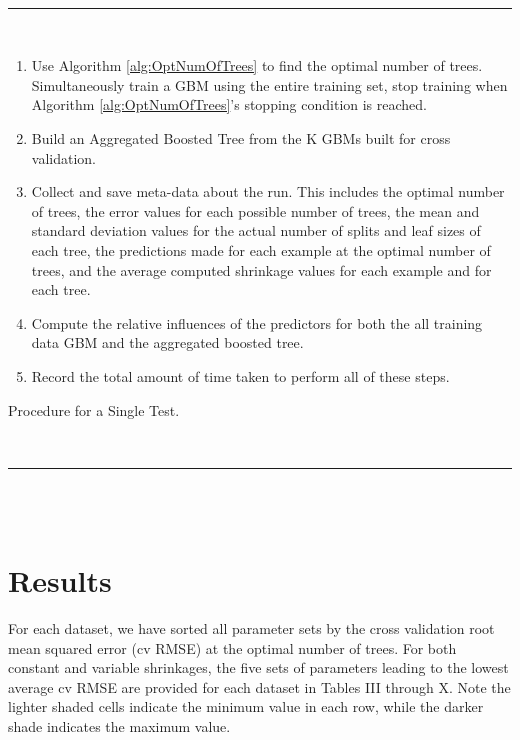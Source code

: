 \documentclass[9pt, conference]{IEEEtran}
\begin{document}
\begin{algorithm}[]
	\hspace{1 mm} \\\hrule\hspace{1 mm} \\
	\begin{enumerate}
		\item Use Algorithm \ref{alg:OptNumOfTrees} to find the optimal number of trees. Simultaneously train a GBM using the entire training set, stop training when Algorithm \ref{alg:OptNumOfTrees}'s stopping condition is reached.
		\item Build an Aggregated Boosted Tree from the K GBMs built for cross validation.
		\item Collect and save meta-data about the run. This includes the optimal number of trees, the error values for each possible number of trees, the mean and standard deviation values for the actual number of splits and leaf sizes of each tree, the predictions made for each example at the optimal number of trees, and the average computed shrinkage values for each example and for each tree.
		\item Compute the relative influences of the predictors for both the all training data GBM and the aggregated boosted tree.
		\item Record the total amount of time taken to perform all of these steps.
	\end{enumerate}
	\caption{Procedure for a Single Test.}
	\hspace{1 mm} \\\hrule\hspace{1 mm} \\\hspace{1 mm} \\
	\label{alg:tuningProcedure}
\end{algorithm}%

\begin{figure}[!t]

\end{figure}
\section{Results}

For each dataset, we have sorted all parameter sets by the cross validation root mean squared error (cv RMSE) at the optimal number of trees. For both constant and variable shrinkages, the five sets of parameters leading to the lowest average cv RMSE are provided for each dataset in Tables III through X. Note the lighter shaded cells indicate the minimum value in each row, while the darker shade indicates the maximum value.
\end{document}
